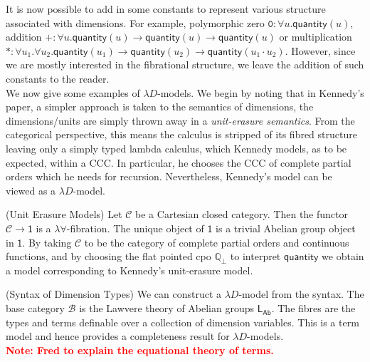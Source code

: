 \documentclass[a4paper,UKenglish]{lipics}
\newcommand\note[1]{{ \bf \textcolor{red} {\vspace{2mm}\; \\ Note: #1\\}}}
\newcommand{\ra}{\rightarrow}
\newcommand{\msf}[1]{\mathsf{#1}} %
\newcommand{\LAb}{\msf{L}_{\msf{Ab}}}
\newcommand{\terminal}{\msf{1}}
\newcommand{\B}{\mathcal{B}}
\newcommand{\C}{\mathcal{C}}
\newcommand{\bbQ}{\mathbb{Q}}
\newcommand{\qnt}{\msf{quantity}}
\begin{document}
It is now possible to add in some constants to represent various structure associated with dimensions. For example, polymorphic zero $\mathtt{0} : \forall u . \qnt(u)$, addition $\mathtt{+}: \forall u. \qnt(u) \rightarrow \qnt(u) \rightarrow \qnt(u)$ or multiplication $\mathtt{*} : \forall u_1 . \forall u_2 . \qnt(u_1) \rightarrow \qnt(u_2) \rightarrow \qnt(u_1 \cdot u_2)$. However, since we are mostly interested in the fibrational structure, we leave the addition of such constants to the reader.\\

We now give some examples of $\lambda D$-models. We begin by noting that in Kennedy's paper, a simpler approach is taken to the semantics of dimensions, the dimensions/units are simply thrown away in a {\em unit-erasure semantics}. From the categorical perspective, this means the calculus is stripped of its fibred structure leaving only a simply typed lambda calculus, which Kennedy models, as to be expected, within a CCC. In particular, he chooses the CCC of complete partial orders which he needs for recursion. Nevertheless, Kennedy's model can be viewed as a $\lambda D$-model.

\begin{example}(Unit Erasure Models)
\label{ex:UnitErasure}
Let $\C$ be a Cartesian closed category. Then the functor $\C \ra \terminal$ is a $\lambda\forall$-fibration. The unique object of $\terminal$ is a trivial Abelian group object in $\terminal$. By taking $\C$ to be the category of complete partial orders and continuous functions, and by choosing the flat pointed cpo $\bbQ_{\bot}$ to interpret $\qnt$ we obtain a model corresponding to Kennedy's unit-erasure model.
\end{example}


\begin{example}(Syntax of Dimension Types)
We can construct a $\lambda D$-model from the syntax. The base category $\B$ is the Lawvere theory of Abelian groups $\LAb$. The fibres are the types and terms definable over a collection of dimension variables. This is a term model and hence provides a completeness result for $\lambda D$-models.
\note{Fred to explain the equational theory of terms.}\end{example}
\end{document}

